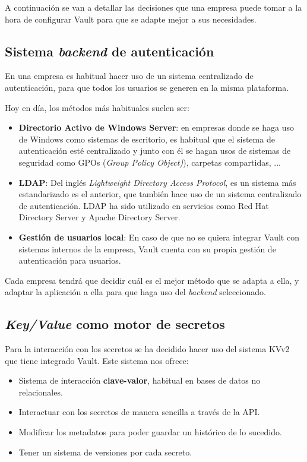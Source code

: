 \documentclass{\ClassPath/viu-tfm-template}
\begin{document}
A continuación se van a detallar las decisiones que una empresa puede tomar a la hora de configurar Vault para que se adapte mejor a sus necesidades.

\hypertarget{sistema_backend}{}
\subsection{Sistema \textit{backend} de autenticación}

En una empresa es habitual hacer uso de un sistema centralizado de autenticación, para que todos los usuarios se generen en la misma plataforma.

Hoy en día, los métodos más habituales suelen ser:
\begin{itemize}
    \item \textbf{Directorio Activo de Windows Server}: en empresas donde se haga uso de Windows como sistemas de escritorio, es habitual que el sistema de autenticación esté centralizado y junto con él se hagan usos de sistemas de seguridad como GPOs (\textit{Group Policy Object)}), carpetas compartidas, ...
    \item \textbf{LDAP}: Del inglés \textit{Lightweight Directory Access Protocol}, es un sistema más estandarizado es el anterior, que también hace uso de un sistema centralizado de autenticación. LDAP ha sido utilizado en servicios como Red Hat Directory Server y Apache Directory Server.

    \item \textbf{Gestión de usuarios local}: En caso de que no se quiera integrar Vault con sistemas internos de la empresa, Vault cuenta con su propia gestión de autenticación para usuarios.
\end{itemize}

Cada empresa tendrá que decidir cuál es el mejor método que se adapta a ella, y adaptar la aplicación a ella para que haga uso del \textit{backend} seleccionado.


\subsection{\textit{Key/Value} como motor de secretos}
Para la interacción con los secretos se ha decidido hacer uso del sistema KVv2 que tiene integrado Vault. Este sistema nos ofrece:

\begin{itemize}
    \item Sistema de interacción \textbf{clave-valor}, habitual en bases de datos no relacionales.
    \item Interactuar con los secretos de manera sencilla a través de la API.
    \item Modificar los metadatos para poder guardar un histórico de lo sucedido.
    \item Tener un sistema de versiones por cada secreto.
\end{itemize}
\end{document}
